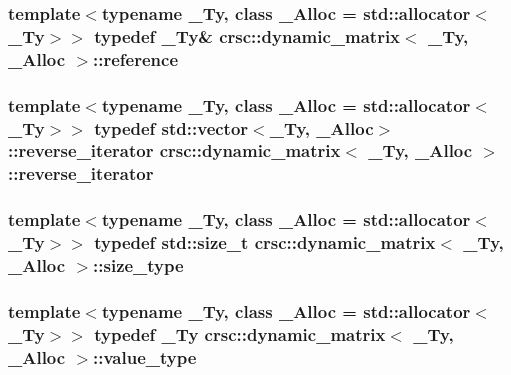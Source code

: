 \subsubsection[{\texorpdfstring{reference}{reference}}]{\setlength{\rightskip}{0pt plus 5cm}template$<$typename \+\_\+\+Ty, class \+\_\+\+Alloc = std\+::allocator$<$\+\_\+\+Ty$>$$>$ typedef \+\_\+\+Ty\& {\bf crsc\+::dynamic\+\_\+matrix}$<$ \+\_\+\+Ty, \+\_\+\+Alloc $>$\+::{\bf reference}}\hypertarget{classcrsc_1_1dynamic__matrix_ad5dc61e01a1c64395f328ef851a5ffcf}{}\label{classcrsc_1_1dynamic__matrix_ad5dc61e01a1c64395f328ef851a5ffcf}
\subsubsection[{\texorpdfstring{reverse\+\_\+iterator}{reverse_iterator}}]{\setlength{\rightskip}{0pt plus 5cm}template$<$typename \+\_\+\+Ty, class \+\_\+\+Alloc = std\+::allocator$<$\+\_\+\+Ty$>$$>$ typedef std\+::vector$<$\+\_\+\+Ty, \+\_\+\+Alloc$>$\+::{\bf reverse\+\_\+iterator} {\bf crsc\+::dynamic\+\_\+matrix}$<$ \+\_\+\+Ty, \+\_\+\+Alloc $>$\+::{\bf reverse\+\_\+iterator}}\hypertarget{classcrsc_1_1dynamic__matrix_af87d57ef714d48cde9ae83bfda908243}{}\label{classcrsc_1_1dynamic__matrix_af87d57ef714d48cde9ae83bfda908243}
\subsubsection[{\texorpdfstring{size\+\_\+type}{size_type}}]{\setlength{\rightskip}{0pt plus 5cm}template$<$typename \+\_\+\+Ty, class \+\_\+\+Alloc = std\+::allocator$<$\+\_\+\+Ty$>$$>$ typedef std\+::size\+\_\+t {\bf crsc\+::dynamic\+\_\+matrix}$<$ \+\_\+\+Ty, \+\_\+\+Alloc $>$\+::{\bf size\+\_\+type}}\hypertarget{classcrsc_1_1dynamic__matrix_a52b776dc7f60d8798c884d7d3c361a8a}{}\label{classcrsc_1_1dynamic__matrix_a52b776dc7f60d8798c884d7d3c361a8a}
\subsubsection[{\texorpdfstring{value\+\_\+type}{value_type}}]{\setlength{\rightskip}{0pt plus 5cm}template$<$typename \+\_\+\+Ty, class \+\_\+\+Alloc = std\+::allocator$<$\+\_\+\+Ty$>$$>$ typedef \+\_\+\+Ty {\bf crsc\+::dynamic\+\_\+matrix}$<$ \+\_\+\+Ty, \+\_\+\+Alloc $>$\+::{\bf value\+\_\+type}}\hypertarget{classcrsc_1_1dynamic__matrix_a27b83d28002e3e2bb316f1f0460e9cca}{}\label{classcrsc_1_1dynamic__matrix_a27b83d28002e3e2bb316f1f0460e9cca}


